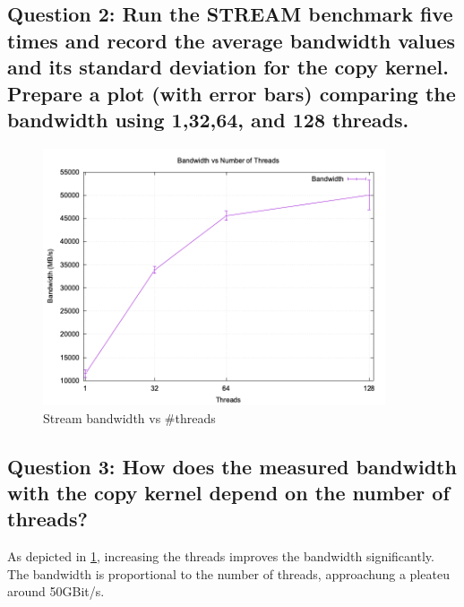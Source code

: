 \documentclass[a4paper,10pt]{article}
\begin{document}
\subsection{Question 2: Run the STREAM benchmark five times and record the average bandwidth values and its standard deviation for the copy kernel. Prepare a plot (with error bars) comparing the bandwidth using 1,32,64, and 128 threads.}
\begin{figure}[H]
  \centering
  \includegraphics[width=0.9\textwidth]{img/ex2/ex2_threads.png}
  \caption{Stream bandwidth vs \#threads}
  \label{fig:ex2-threads}
\end{figure}

\subsection{Question 3: How does the measured bandwidth with the copy kernel depend on the number of threads?}
As depicted in \ref{fig:ex2-threads}, increasing the threads improves the bandwidth significantly.
The bandwidth is proportional to the number of threads, approachung a pleateu around 50GBit/s.
\end{document}
